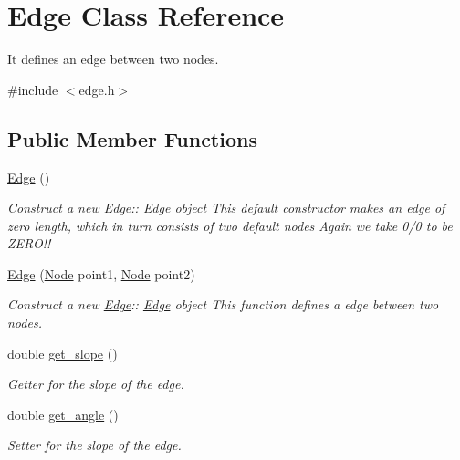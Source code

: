 \hypertarget{classEdge}{}\section{Edge Class Reference}
\label{classEdge}


It defines an edge between two nodes.  




{\ttfamily \#include $<$edge.\+h$>$}

\subsection*{Public Member Functions}
\begin{DoxyCompactItemize}
\item 
\mbox{\label{classEdge_a3106b11d60125009dbf7a738ce540fdf}} 
\hyperlink{classEdge_a3106b11d60125009dbf7a738ce540fdf}{Edge} ()
\begin{DoxyCompactList}\small\item\em Construct a new \hyperlink{classEdge}{Edge}\+:\+: \hyperlink{classEdge}{Edge} object This default constructor makes an edge of zero length, which in turn consists of two default nodes Again we take 0/0 to be Z\+E\+R\+O!! \end{DoxyCompactList}\item 
\hyperlink{classEdge_a5930482e8b7cde1ed3b7009f3028a920}{Edge} (\hyperlink{classNode}{Node} point1, \hyperlink{classNode}{Node} point2)
\begin{DoxyCompactList}\small\item\em Construct a new \hyperlink{classEdge}{Edge}\+:\+: \hyperlink{classEdge}{Edge} object This function defines a edge between two nodes. \end{DoxyCompactList}\item 
double \hyperlink{classEdge_a2ff0f1ff41d7dbf210a634dbfa9cca43}{get\+\_\+slope} ()
\begin{DoxyCompactList}\small\item\em Getter for the slope of the edge. \end{DoxyCompactList}\item 
double \hyperlink{classEdge_a9a8aef5515cc448ee630382e028b56e6}{get\+\_\+angle} ()
\begin{DoxyCompactList}\small\item\em Setter for the slope of the edge. \end{DoxyCompactList}\item 

\end{DoxyCompactItemize}
